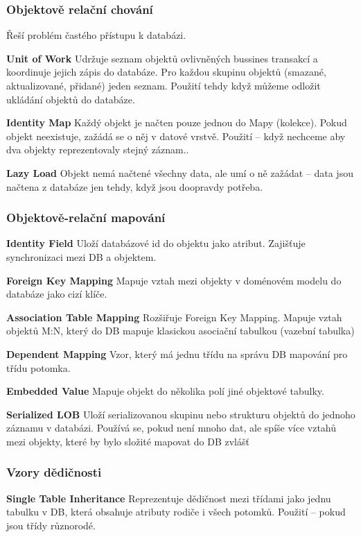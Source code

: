 \subsubsection{Objektově relační chování}
Řeší problém častého přístupu k databázi.

\textbf{Unit of Work} Udržuje seznam objektů ovlivněných bussines transakcí a koordinuje jejich zápis do databáze. Pro každou skupinu objektů (smazané, aktualizované, přidané) jeden seznam. Použití tehdy když můžeme odložit ukládání objektů do databáze.

\textbf{Identity Map} Každý objekt je načten pouze jednou do Mapy (kolekce). Pokud objekt neexistuje, zažádá se o něj v datové vrstvě. Použití – když nechceme aby dva objekty reprezentovaly stejný záznam..

\textbf{Lazy Load} Objekt nemá načtené všechny data, ale umí o ně zažádat – data jsou načtena z databáze jen tehdy, když jsou doopravdy potřeba.

\subsubsection{Objektově-relační mapování}
\textbf{Identity Field} Uloží databázové id do objektu jako atribut. Zajišťuje synchronizaci mezi DB a objektem.

\textbf{Foreign Key Mapping} Mapuje vztah mezi objekty v doménovém modelu do databáze jako cizí klíče.

\textbf{Association Table Mapping} Rozšiřuje Foreign Key Mapping. Mapuje vztah objektů M:N, který do DB mapuje klasickou asociační tabulkou (vazební tabulka)

\textbf{Dependent Mapping} Vzor, který má jednu třídu na správu DB mapování pro třídu potomka.

\textbf{Embedded Value} Mapuje objekt do několika polí jiné objektové tabulky.

\textbf{Serialized LOB} Uloží serializovanou skupinu nebo strukturu objektů do jednoho záznamu v databázi. Používá se, pokud není mnoho dat, ale spíše více vztahů mezi objekty, které by bylo složité mapovat do DB zvlášť

\subsubsection{Vzory dědičnosti}
\textbf{Single Table Inheritance} Reprezentuje dědičnost mezi třídami jako jednu tabulku v DB, která obsahuje atributy rodiče i všech potomků. Použití – pokud jsou třídy různorodé.


